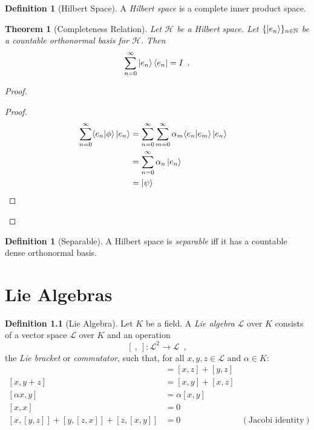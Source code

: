 \documentclass{book}
\let\qed\relax
\newtheorem{thm}[prop]{Theorem}
\theoremstyle{definition}
\newtheorem{df}[prop]{Definition}
\begin{document}
\begin{df}[Hilbert Space]
A \emph{Hilbert space} is a complete inner product space.
\end{df}

\begin{thm}[Completeness Relation]
Let $\mathcal{H}$ be a Hilbert space. Let $\{ \left| {e_n} \right\rangle \}_{n \in \mathbb{N}}$ be a countable orthonormal basis for $\mathcal{H}$. Then
\[ \sum_{n=0}^\infty \left| {e_n} \right\rangle \left\langle {e_n} \right| = I \enspace . \]
\end{thm}

\begin{proof}
\pf
{}
\begin{proof}
	\pf
	\begin{align*}
		\sum_{n=0}^\infty \langle e_n | \phi \rangle \ket{e_n} & = \sum_{n=0}^\infty \sum_{m=0}^\infty \alpha_m \langle e_n | e_m \rangle \ket{e_n} \\
		& = \sum_{n=0}^\infty \alpha_n \ket{e_n} \\
		& = \ket{\psi} & \qed
	\end{align*}
\end{proof}
\qed
\end{proof}

\begin{df}[Separable]
A Hilbert space is \emph{separable} iff it has a countable dense orthonormal basis.
\end{df}

\chapter{Lie Algebras}

\begin{df}[Lie Algebra]
Let $K$ be a field.
A \emph{Lie algebra} $\mathcal{L}$ over $K$ consists of a vector space $\mathcal{L}$ over $K$ and an operation
\[ [\ ,\ ] : \mathcal{L}^2 \rightarrow \mathcal{L} \enspace , \]
the \emph{Lie bracket} or \emph{commutator}, such that, for all $x,y,z \in \mathcal{L}$ and $\alpha \in K$:
\begin{align*}
[x+y,z] & = [x,z] + [y,z] \\
[x,y+z] & = [x,y] + [x,z] \\
[\alpha x,y] & = \alpha [x,y] \\
[x,x] & = 0 \\
[x,[y,z]] + [y,[z,x]] + [z,[x,y]] & = 0 & (\text{Jacobi identity})
\end{align*}
\end{df}
\end{document}
